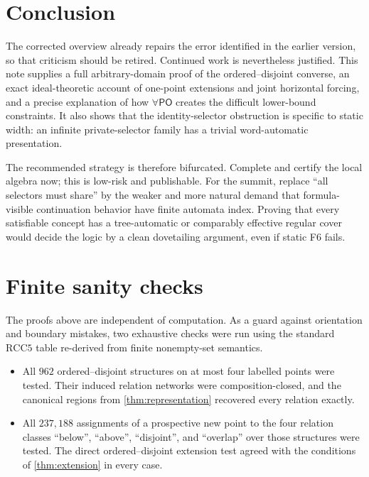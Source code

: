\documentclass[11pt]{article}
\theoremstyle{definition}
\theoremstyle{remark}
\newcommand{\RCC}{\mathrm{RCC5}}
\newcommand{\PO}{\mathsf{PO}}
\begin{document}
\section{Conclusion}

The corrected overview already repairs the error identified in the earlier version, so that criticism should be retired.  Continued work is nevertheless justified.  This note supplies a full arbitrary-domain proof of the ordered--disjoint converse, an exact ideal-theoretic account of one-point extensions and joint horizontal forcing, and a precise explanation of how $\forall\PO$ creates the difficult lower-bound constraints.  It also shows that the identity-selector obstruction is specific to static width: an infinite private-selector family has a trivial word-automatic presentation.

The recommended strategy is therefore bifurcated.  Complete and certify the local algebra now; this is low-risk and publishable.  For the summit, replace ``all selectors must share'' by the weaker and more natural demand that formula-visible continuation behavior have finite automata index.  Proving that every satisfiable concept has a tree-automatic or comparably effective regular cover would decide the logic by a clean dovetailing argument, even if static F6 fails.

\appendix
\section{Finite sanity checks}

The proofs above are independent of computation.  As a guard against orientation and boundary mistakes, two exhaustive checks were run using the standard $\RCC$ table re-derived from finite nonempty-set semantics.

\begin{itemize}[leftmargin=2em]
\item All $962$ ordered--disjoint structures on at most four labelled points were tested.  Their induced relation networks were composition-closed, and the canonical regions from \cref{thm:representation} recovered every relation exactly.
\item All $237{,}188$ assignments of a prospective new point to the four relation classes ``below'', ``above'', ``disjoint'', and ``overlap'' over those structures were tested.  The direct ordered--disjoint extension test agreed with the conditions of \cref{thm:extension} in every case.
\end{itemize}
\end{document}
